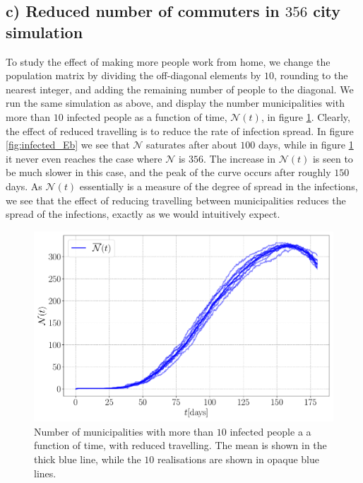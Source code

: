 \subsection{c) Reduced number of commuters in $356$ city simulation}

To study the effect of making more people work from home, we change the population matrix by dividing the off-diagonal elements by $10$, rounding to the nearest integer, and adding the remaining number of people to the diagonal. We run the same simulation as above, and display the number municipalities with more than $10$ infected people as a function of time, $\mathcal{N}(t)$,  in figure \ref{fig:infected_Ec}. Clearly, the effect of reduced travelling is to reduce the rate of infection spread. In figure \ref{fig:infected_Eb} we see that $\mathcal{N}$ saturates after about $100$ days, while in figure \ref{fig:infected_Ec} it never even reaches the case where $\mathcal{N}$ is $356$. The increase in $\mathcal{N}(t)$ is seen to be much slower in this case, and the peak of the curve occurs after roughly $150$ days. As $\mathcal{N}(t)$ essentially is a measure of the degree of spread in the infections, we see that the effect of reducing travelling between municipalities reduces the spread of the infections, exactly as we would intuitively expect.


\begin{figure}[htb]
	\centering
	\includegraphics[width=0.9\columnwidth]{../fig/2Ec_N.pdf}
	\caption{Number of municipalities with more than $10$ infected people a a function of time, with reduced travelling.  The mean is shown in the thick blue line, while the $10$ realisations are shown in opaque blue lines.}
	\label{fig:infected_Ec}
\end{figure}
